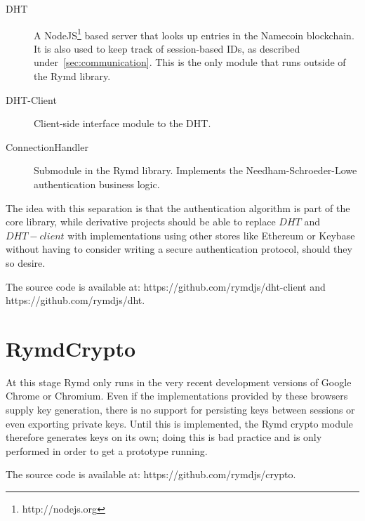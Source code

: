 \begin{description}
  \item[DHT] A NodeJS\footnote{http://nodejs.org} based server that looks up entries in the Namecoin blockchain. It is also used to keep track of session-based IDs, as described under~\ref{sec:communication}. This is the only module that runs outside of the Rymd library.
  \item[DHT-Client] Client-side interface module to the DHT.
  \item[ConnectionHandler] Submodule in the Rymd library. Implements the Needham-Schroeder-Lowe authentication business logic.
\end{description}

The idea with this separation is that the authentication algorithm is part of the core library, while derivative projects should be able to replace $DHT$ and $DHT-client$ with implementations using other stores like Ethereum or Keybase without having to consider writing a secure authentication protocol, should they so desire.

The source code is available at: https://github.com/rymdjs/dht-client and https://github.com/rymdjs/dht.

\section{RymdCrypto}
\label{sec:cryptography}
At this stage Rymd only runs in the very recent development versions of Google Chrome or Chromium.
Even if the implementations provided by these browsers supply key generation, there is no support for persisting keys between sessions or even exporting private keys. Until this is implemented, the Rymd crypto module therefore generates keys on its own; doing this is bad practice and is only performed in order to get a prototype running.

The source code is available at: https://github.com/rymdjs/crypto.

